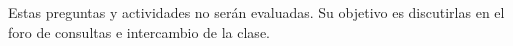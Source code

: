 \begin{enumerate}
\begin{enumerate}
\end{enumerate}

Estas preguntas y actividades no serán evaluadas. Su objetivo es discutirlas en el foro de consultas e intercambio de la clase.



